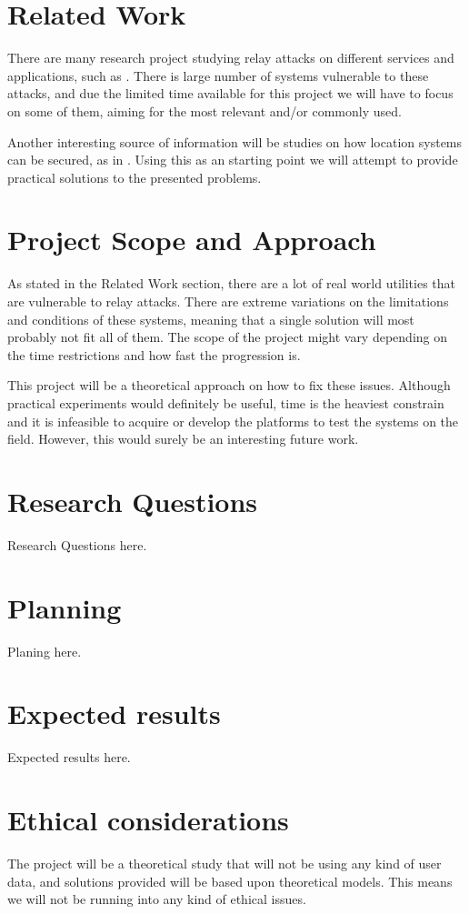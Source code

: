 \documentclass{article}
\begin{document}
\section{Related Work}
There are many research project studying relay attacks on different services and applications, such as \cite{carentry, contactless}. There is large number of systems vulnerable to these attacks, and due the limited time available for this project we will have to focus on some of them, aiming for the most relevant and/or commonly used.

Another interesting source of information will be studies on how location systems can be secured, as in \cite{securepos}. Using this as an starting point we will attempt to provide practical solutions to the presented problems.

\section{Project Scope and Approach}
As stated in the Related Work section, there are a lot of real world utilities that are vulnerable to relay attacks. There are extreme variations on the limitations and conditions of these systems, meaning that a single solution will most probably not fit all of them. The scope of the project might vary depending on the time restrictions and how fast the progression is.

This project will be a theoretical approach on how to fix these issues. Although practical experiments would definitely be useful, time is the heaviest constrain and it is infeasible to acquire or develop the platforms to test the systems on the field. However, this would surely be an interesting future work.

\section{Research Questions}
Research Questions here.

\section{Planning}
Planing here.

\section{Expected results}
Expected results here.

\section{Ethical considerations}
The project will be a theoretical study that will not be using any kind of user data, and solutions provided will be based upon theoretical models. This means we will not be running into any kind of ethical issues.
\end{document}
